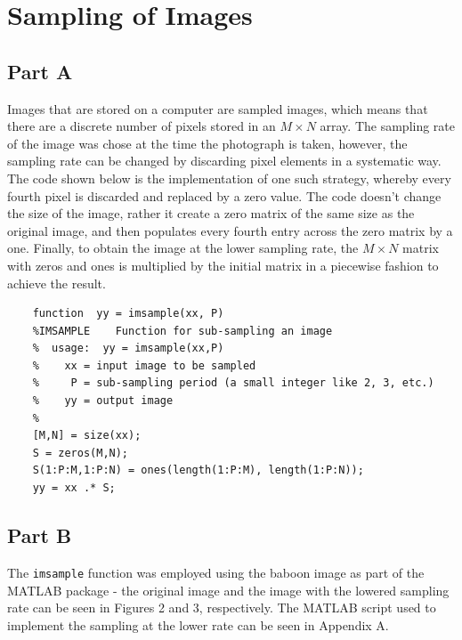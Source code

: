 \documentclass{article}
\begin{document}
\section{Sampling of Images}

\subsection{Part A}
Images that are stored on a computer are sampled images, which means that there are a discrete number of pixels stored in an $M \times N$ array. The sampling rate of the image was chose at the time the photograph is taken, however, the sampling rate can be changed by discarding pixel elements in a systematic way. The code shown below is the implementation of one such strategy, whereby every fourth pixel is discarded and replaced by a zero value. The code doesn't change the size of the image, rather it create a zero matrix of the same size as the original image, and then populates every fourth entry across the zero matrix by a one. Finally, to obtain the image at the lower sampling rate, the $M \times N$ matrix with zeros and ones is multiplied by the initial matrix in a piecewise fashion to achieve the result.

\begin{lstlisting}
	function  yy = imsample(xx, P)
	%IMSAMPLE    Function for sub-sampling an image
	%  usage:  yy = imsample(xx,P)
	%    xx = input image to be sampled
	%     P = sub-sampling period (a small integer like 2, 3, etc.)
	%    yy = output image
	%
	[M,N] = size(xx);
	S = zeros(M,N);
	S(1:P:M,1:P:N) = ones(length(1:P:M), length(1:P:N));
	yy = xx .* S;
\end{lstlisting}


\subsection{Part B}
The \verb|imsample| function was employed using the baboon image as part of the MATLAB package - the original image and the image with the lowered sampling rate can be seen in Figures 2 and 3, respectively. The MATLAB script used to implement the sampling at the lower rate can be seen in Appendix A.
\end{document}
